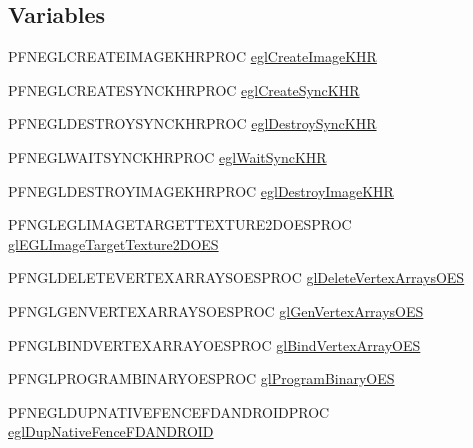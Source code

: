 \subsection*{Variables}
\begin{DoxyCompactItemize}
\item 
P\+F\+N\+E\+G\+L\+C\+R\+E\+A\+T\+E\+I\+M\+A\+G\+E\+K\+H\+R\+P\+R\+OC \mbox{\hyperlink{namespacehwcomposer_a1b9b71782e10965d5f44995bac78ac92}{egl\+Create\+Image\+K\+HR}}
\item 
P\+F\+N\+E\+G\+L\+C\+R\+E\+A\+T\+E\+S\+Y\+N\+C\+K\+H\+R\+P\+R\+OC \mbox{\hyperlink{namespacehwcomposer_aa4f7bf2ebb58d75fd8c42abff106d278}{egl\+Create\+Sync\+K\+HR}}
\item 
P\+F\+N\+E\+G\+L\+D\+E\+S\+T\+R\+O\+Y\+S\+Y\+N\+C\+K\+H\+R\+P\+R\+OC \mbox{\hyperlink{namespacehwcomposer_afdd4be68020d78ee60456fbb07576228}{egl\+Destroy\+Sync\+K\+HR}}
\item 
P\+F\+N\+E\+G\+L\+W\+A\+I\+T\+S\+Y\+N\+C\+K\+H\+R\+P\+R\+OC \mbox{\hyperlink{namespacehwcomposer_a8e34f7fe887f616d18cdb67570c15963}{egl\+Wait\+Sync\+K\+HR}}
\item 
P\+F\+N\+E\+G\+L\+D\+E\+S\+T\+R\+O\+Y\+I\+M\+A\+G\+E\+K\+H\+R\+P\+R\+OC \mbox{\hyperlink{namespacehwcomposer_ad9eca82e16b82126b8288f15027d7eae}{egl\+Destroy\+Image\+K\+HR}}
\item 
P\+F\+N\+G\+L\+E\+G\+L\+I\+M\+A\+G\+E\+T\+A\+R\+G\+E\+T\+T\+E\+X\+T\+U\+R\+E2\+D\+O\+E\+S\+P\+R\+OC \mbox{\hyperlink{namespacehwcomposer_ae0c1af9f8e55e18591c646640bb289a3}{gl\+E\+G\+L\+Image\+Target\+Texture2\+D\+O\+ES}}
\item 
P\+F\+N\+G\+L\+D\+E\+L\+E\+T\+E\+V\+E\+R\+T\+E\+X\+A\+R\+R\+A\+Y\+S\+O\+E\+S\+P\+R\+OC \mbox{\hyperlink{namespacehwcomposer_a46185e5ed06a45be5a194dc535e742dc}{gl\+Delete\+Vertex\+Arrays\+O\+ES}}
\item 
P\+F\+N\+G\+L\+G\+E\+N\+V\+E\+R\+T\+E\+X\+A\+R\+R\+A\+Y\+S\+O\+E\+S\+P\+R\+OC \mbox{\hyperlink{namespacehwcomposer_a593d085270cdd62b18ad5f33429025fd}{gl\+Gen\+Vertex\+Arrays\+O\+ES}}
\item 
P\+F\+N\+G\+L\+B\+I\+N\+D\+V\+E\+R\+T\+E\+X\+A\+R\+R\+A\+Y\+O\+E\+S\+P\+R\+OC \mbox{\hyperlink{namespacehwcomposer_a01ff1e215a53e156ec5064e53af6ab65}{gl\+Bind\+Vertex\+Array\+O\+ES}}
\item 
P\+F\+N\+G\+L\+P\+R\+O\+G\+R\+A\+M\+B\+I\+N\+A\+R\+Y\+O\+E\+S\+P\+R\+OC \mbox{\hyperlink{namespacehwcomposer_ad46a3e1b8ae0f14cc95e445251545900}{gl\+Program\+Binary\+O\+ES}}
\item 
P\+F\+N\+E\+G\+L\+D\+U\+P\+N\+A\+T\+I\+V\+E\+F\+E\+N\+C\+E\+F\+D\+A\+N\+D\+R\+O\+I\+D\+P\+R\+OC \mbox{\hyperlink{namespacehwcomposer_a25459e53d7cddc64d03b86d5c6a961a3}{egl\+Dup\+Native\+Fence\+F\+D\+A\+N\+D\+R\+O\+ID}}

\end{DoxyCompactItemize}
